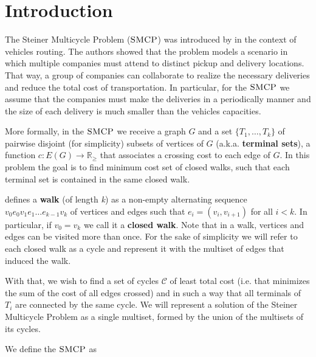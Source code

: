 \chapter{Introduction}
\label{chapter:introduction}

The Steiner Multicycle Problem (\(\textsc{SMCP}\)) was introduced by \cite{Pereira2018TheSM} in the context of vehicles routing. The authors showed that the problem models a scenario in which multiple companies must attend to distinct pickup and delivery locations. That way, a group of companies can collaborate to realize the necessary deliveries and reduce the total cost of transportation. In particular, for the \(\textsc{SMCP}\) we assume that the companies must make the deliveries in a periodically manner and the size of each delivery is much smaller than the vehicles capacities.

More formally, in the \(\textsc{SMCP}\) we receive a graph \(G\) and a set \(\{T_1, \dots, T_k\}\) of pairwise disjoint (for simplicity) subsets of vertices of \(G\) (a.k.a. \textbf{terminal sets}), a function $c \colon E(G) \to \mathbb{R}_\ge$ that associates a crossing cost to each edge of \(G\). In this problem the goal is to find minimum cost set of closed walks, such that each terminal set is contained in the same closed walk.

\cite{Diestel} defines a \textbf{walk} (of length \textit{k}) as a non-empty alternating sequence \(v_0 e_0 v_1 e_1 \dots e_{k-1} v_k\) of vertices and edges such that \(e_i = (v_i, v_{i+1})\) for all \(i < k\). In particular, if \(v_0 = v_k\) we call it a \textbf{closed walk}. Note that in a walk, vertices and edges can be visited more than once. For the sake of simplicity we will refer to each closed walk as a cycle and represent it with the multiset of edges that induced the walk.

With that, we wish to find a set of cycles \(\mathcal{C}\) of least total cost (i.e. that minimizes the sum of the cost of all edges crossed) and in such a way that all terminals of \(T_i\) are connected by the same cycle. We will represent a solution of the Steiner Multicycle Problem as a single multiset, formed by the union of the multisets of its cycles.

We define the \(\textsc{SMCP}\) as 

\medskip
\noindent {}
\medskip

